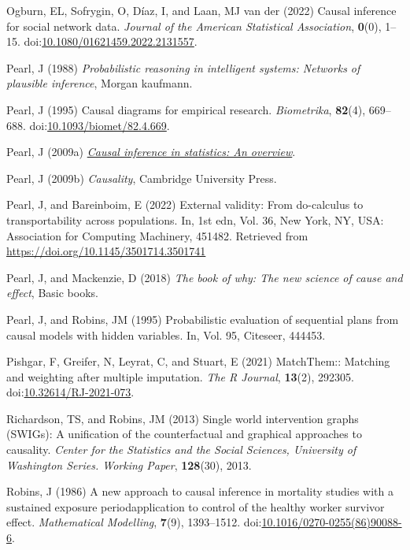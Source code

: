 \documentclass[
  singlecolumn]{article}
\newlength{\cslhangindent}
\newenvironment{CSLReferences}[2] %
 {\begin{list}{}{%
  \setlength{\itemindent}{0pt}
  \setlength{\leftmargin}{0pt}
  \setlength{\parsep}{0pt}
  \ifodd #1
   \setlength{\leftmargin}{\cslhangindent}
   \setlength{\itemindent}{-1\cslhangindent}
  \fi
  \setlength{\itemsep}{#2\baselineskip}}}
 {\end{list}}
\begin{document}
\begin{CSLReferences}{1}{0}
Ogburn, EL, Sofrygin, O, Díaz, I, and Laan, MJ van der (2022) Causal
inference for social network data. \emph{Journal of the American
Statistical Association}, \textbf{0}(0), 1--15.
doi:\href{https://doi.org/10.1080/01621459.2022.2131557}{10.1080/01621459.2022.2131557}.

Pearl, J (1988) \emph{Probabilistic reasoning in intelligent systems:
Networks of plausible inference}, Morgan kaufmann.

Pearl, J (1995) Causal diagrams for empirical research.
\emph{Biometrika}, \textbf{82}(4), 669--688.
doi:\href{https://doi.org/10.1093/biomet/82.4.669}{10.1093/biomet/82.4.669}.

Pearl, J (2009a) \emph{\href{https://doi.org/10.1214/09-SS057}{Causal
inference in statistics: An overview}}.

Pearl, J (2009b) \emph{Causality}, Cambridge University Press.

Pearl, J, and Bareinboim, E (2022) External validity: From do-calculus
to transportability across populations. In, 1st edn, Vol. 36, New York,
NY, USA: Association for Computing Machinery, 451482. Retrieved from
\url{https://doi.org/10.1145/3501714.3501741}

Pearl, J, and Mackenzie, D (2018) \emph{The book of why: The new science
of cause and effect}, Basic books.

Pearl, J, and Robins, JM (1995) Probabilistic evaluation of sequential
plans from causal models with hidden variables. In, Vol. 95, Citeseer,
444453.

Pishgar, F, Greifer, N, Leyrat, C, and Stuart, E (2021) MatchThem::
Matching and weighting after multiple imputation. \emph{The R Journal},
\textbf{13}(2), 292305.
doi:\href{https://doi.org/10.32614/RJ-2021-073}{10.32614/RJ-2021-073}.

Richardson, TS, and Robins, JM (2013) Single world intervention graphs
(SWIGs): A unification of the counterfactual and graphical approaches to
causality. \emph{Center for the Statistics and the Social Sciences,
University of Washington Series. Working Paper}, \textbf{128}(30), 2013.

Robins, J (1986) A new approach to causal inference in mortality studies
with a sustained exposure period{\textemdash}application to control of
the healthy worker survivor effect. \emph{Mathematical Modelling},
\textbf{7}(9), 1393--1512.
doi:\href{https://doi.org/10.1016/0270-0255(86)90088-6}{10.1016/0270-0255(86)90088-6}.


\end{CSLReferences}
\end{document}
